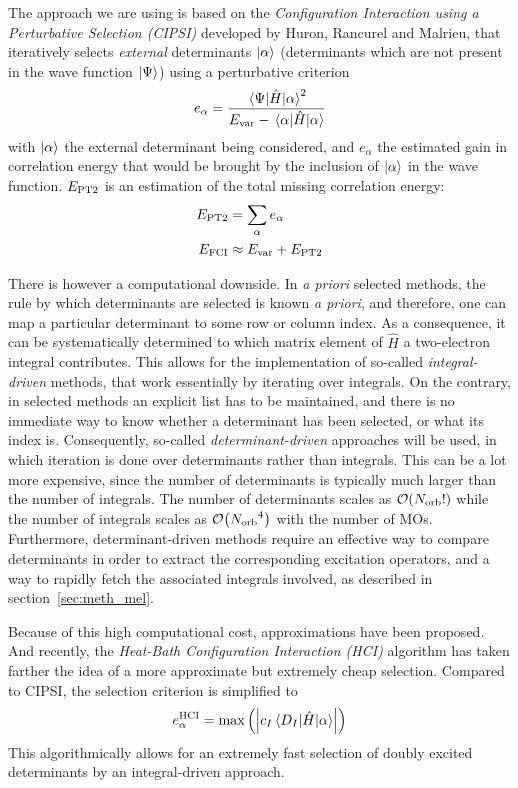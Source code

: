 \documentclass[./thesis.tex]{subfiles}
\begin{document}
The approach we are using is based on the \emph{Configuration Interaction using a Perturbative Selection (CIPSI)} developed by Huron, Rancurel and Malrieu,\cite{Huron_1973} that iteratively selects \emph{external} determinants ${\ket{\alpha}}$ (determinants which are not present in the wave function $\ket \Psi$) using a perturbative criterion
\begin{equation}
e_\alpha = \frac{\mel{\Psi}{\hat{H}}{\alpha}^2}{E_\text{var} - \mel{\alpha}{\hat{H}}{\alpha}}
\end{equation}
with $\ket \alpha$ the external determinant being considered, and $e_\alpha$ the estimated gain in correlation energy that would be brought by the inclusion of $\ket \alpha$ in the wave function. $E_\text{PT2}$ is an estimation of the total missing correlation energy:
\begin{align}
E_\text{PT2} & = \sum_{\alpha} e_\alpha \\
E_\text{FCI} & \approx E_\text{var} + E_\text{PT2}
\end{align}

There is however a computational downside. In \textit{a priori} selected methods, the rule by which determinants are selected is known \textit{a priori}, and therefore, one can map a particular determinant to some row or column index.\cite{Knowles_1984} As a consequence, it can be systematically determined to which matrix element of $\widehat{H}$ a two-electron integral contributes. This allows for the implementation of so-called \emph{integral-driven} methods, that work essentially by iterating over integrals.
On the contrary, in selected methods an explicit list has to be maintained, and there is no immediate way to know whether a determinant has been selected, or what its index is. Consequently, so-called \emph{determinant-driven} approaches will be used, in which iteration is done over determinants rather than integrals. This can be a lot more expensive, since the number of determinants is typically much larger than the number of integrals. The number of determinants scales as $\order{\Norb!}$ while the number of integrals scales as $\order{\Norb^4}$ with the number of MOs.
Furthermore, determinant-driven methods require an effective way to compare determinants in order to extract the corresponding excitation operators, and a way to rapidly fetch the associated integrals involved, as described in section~\ref{sec:meth_mel}.

Because of this high computational cost, approximations have been proposed.\cite{Evangelisti_1983} And recently, the \emph{Heat-Bath Configuration Interaction (HCI)} algorithm has taken farther the idea of a more approximate but extremely cheap selection.\cite{Holmes_2016, Sharma_2017} Compared to CIPSI, the selection criterion is simplified to
\begin{equation}
e^{\text{HCI}}_\alpha = \max \qty( \qty| c_I \mel{D_I}{\hat{H}}{\alpha} | )
\end{equation}
This algorithmically allows for an extremely fast selection of doubly
excited determinants by an integral-driven approach.
\end{document}
